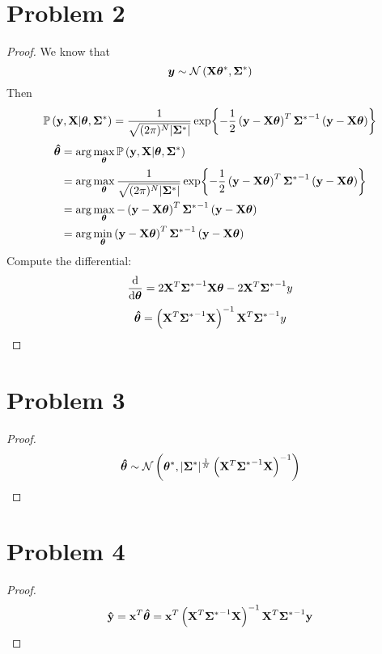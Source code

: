 \documentclass{article}
\begin{document}
\section*{Problem 2}
    \begin{proof}
    We know that $$\vb*{y}\sim \mathcal{N}\left(\vb{X}\bm{\theta}^*, \bm{\Sigma}^*\right)$$ Then
    $$ \mathbb{P}\left(\vb{y},\vb{X}|\bm{\theta},\bm{\Sigma}^*\right)
    =\frac{1}{\sqrt{(2\pi)^N |\bm{\Sigma}^*|}}\exp{-\frac{1}{2}\left(\vb{y}-\vb{X}\bm{\theta}\right)^T{\bm{\Sigma}^*}^{-1}\left(\vb{y}-\vb{X}\bm{\theta}\right)} $$
    \begin{align*}
        \bm{\hat{\theta}} &= \arg{\max_{\bm{\theta}}\mathbb{P}\left(\vb{y},\vb{X}|\bm{\theta},\bm{\Sigma}^*\right)}\\
        &=\arg{\max_{\bm{\theta}}\frac{1}{\sqrt{(2\pi)^N |\bm{\Sigma}^*|}}\exp{-\frac{1}{2}\left(\vb{y}-\vb{X}\bm{\theta}\right)^T{\bm{\Sigma}^*}^{-1}\left(\vb{y}-\vb{X}\bm{\theta}\right)}}\\
        &=\arg{\max_{\bm{\theta}}-\left(\vb{y}-\vb{X}\bm{\theta}\right)^T{\bm{\Sigma}^*}^{-1}\left(\vb{y}-\vb{X}\bm{\theta}\right)}\\
        &=\arg{\min_{\bm{\theta}}\left(\vb{y}-\vb{X}\bm{\theta}\right)^T{\bm{\Sigma}^*}^{-1}\left(\vb{y}-\vb{X}\bm{\theta}\right)}
    \end{align*}
    Compute the differential:
    $$\frac{\text{d}}{\text{d}\bm{\theta}}=2\vb{X}^T {\bm{\Sigma}^*}^{-1} \vb{X}\bm{\theta}-2\vb{X}^T {\bm{\Sigma}^*}^{-1} y$$
    $$\bm{\hat{\theta}} = \left(\vb{X}^T{\bm{\Sigma}^*}^{-1}\vb{X}\right)^{-1}\vb{X}^T {\bm{\Sigma}^*}^{-1} y$$
    \end{proof}

\section*{Problem 3}
    \begin{proof}
        $$\bm{\hat{\theta}} \sim \mathcal{N}\left(\bm{\theta}^*,|\bm{\Sigma}^*|^{\frac{1}{N}}\left(\vb{X}^T{\bm{\Sigma}^*}^{-1}\vb{X}\right)^{-1}\right)$$
    \end{proof}

\section*{Problem 4}
    \begin{proof}
        $$\vb{\hat{y}}=\vb{x}^T\bm{\hat{\theta}}=\vb{x}^T\left(\vb{X}^T{\bm{\Sigma}^*}^{-1}\vb{X}\right)^{-1}\vb{X}^T{\bm{\Sigma}^*}^{-1}\vb{y}$$
    \end{proof}
\end{document}
